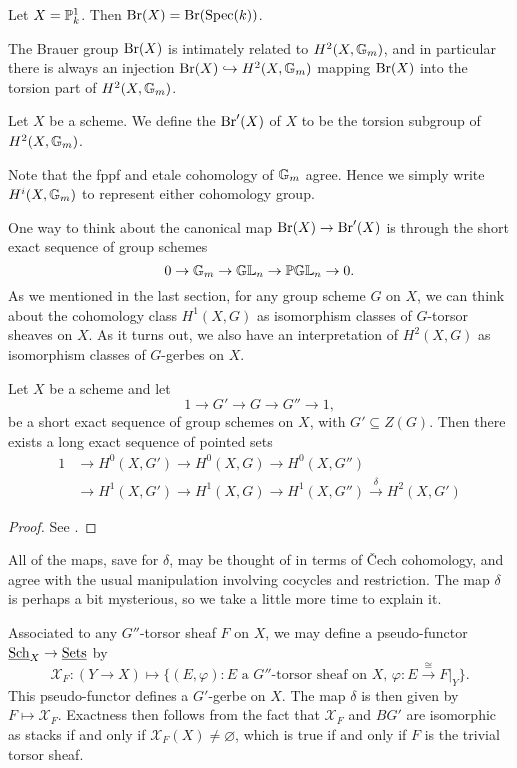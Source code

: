 \begin{ex}
Let $X = \mathbb{P}^1_k$.  Then $\textnormal{Br}(X) = \textnormal{Br}(\textnormal{Spec}(k))$.
\end{ex}

The Brauer group $\textnormal{Br}(X)$ is intimately related to $H^2(X,\mathbb{G}_m)$, and in particular there is always an injection $\textnormal{Br}(X)\hookrightarrow H^2(X,\mathbb{G}_m)$ mapping $\textnormal{Br}(X)$ into the torsion part of $H^2(X,\mathbb{G}_m)$.
\begin{defn}
Let $X$ be a scheme.  We define the  $\textnormal{Br}'(X)$ of $X$ to be the torsion subgroup of $H^2(X,\mathbb{G}_m)$.
\end{defn}

\begin{remk}
Note that the fppf and etale cohomology of $\mathbb{G}_m$ agree.  Hence we simply write $H^i(X,\mathbb{G}_m)$ to represent either cohomology group.
\end{remk}

One way to think about the canonical map $\textnormal{Br}(X)\rightarrow\textnormal{Br}'(X)$ is through the short exact sequence of group schemes
$$0\rightarrow \mathbb{G}_m\rightarrow\mathbb{GL}_n\rightarrow\mathbb{PGL}_n\rightarrow 0.$$
As we mentioned in the last section, for any group scheme $G$ on $X$, we can think about the cohomology class $H^1(X,G)$ as isomorphism classes of $G$-torsor sheaves on $X$.  As it turns out, we also have an interpretation of $H^2(X,G)$ as isomorphism classes of $G$-gerbes on $X$.
\begin{lem}[Giraud]\label{giraurds lemma}
Let $X$ be a scheme and let
$$1\rightarrow G'\rightarrow G\rightarrow G''\rightarrow 1,$$
be a short exact sequence of group schemes on $X$, with $G'\subseteq Z(G)$.  Then there exists a long exact sequence of pointed sets
\begin{align*}
1 & \rightarrow H^0(X,G') \rightarrow H^0(X,G)\rightarrow H^0(X,G'')\\
  & \rightarrow H^1(X,G') \rightarrow H^1(X,G)\rightarrow H^1(X,G'')\xrightarrow{\delta} H^2(X,G')
\end{align*}
\end{lem}
\begin{proof}
See \cite{giraud1971cohomologie}.
\end{proof}
All of the maps, save for $\delta$, may be thought of in terms of \v{C}ech cohomology, and agree with the usual manipulation involving cocycles and restriction.  The map $\delta$ is perhaps a bit mysterious, so we take a little more time to explain it.

Associated to any $G''$-torsor sheaf $F$ on $X$, we may define a pseudo-functor $\textnormal{\underline{Sch}}_X\rightarrow\textnormal{\underline{Sets}}$ by
$$\mathcal{X}_F: (Y\rightarrow X)\mapsto\{(E,\varphi): \text{$E$ a $G''$-torsor sheaf on $X$, $\varphi: E\xrightarrow{\cong} F|_Y$}\}.$$
This pseudo-functor defines a $G'$-gerbe on $X$.  The map $\delta$ is then given by $F\mapsto \mathcal{X}_F$.  Exactness then follows from the fact that $\mathcal{X}_F$ and $BG'$ are isomorphic as stacks if and only if $\mathcal X_F(X)\neq\varnothing$, which is true if and only if $F$ is the trivial torsor sheaf.

